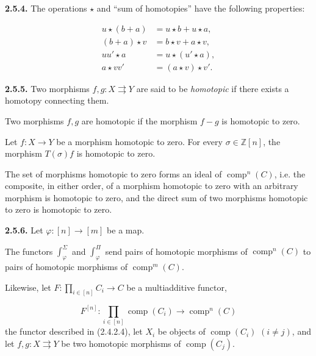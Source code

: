 %
\noindent\textbf{2.5.4.}\quad
The operations $\star$ and ``sum of homotopies'' have the following
properties:

\begin{equation}
  \begin{aligned}
    u\star(b+a) &= u\star b+u\star a,\\
    (b+a)\star v &= b\star v+a\star v,\\
    uu'\star a &= u\star(u'\star a),\\
    a\star vv' &= (a\star v)\star v'.
  \end{aligned}
  \tag{2.5.4.1}
\end{equation}

\noindent\textbf{2.5.5.}\quad
Two morphisms $f,g\colon X\rightrightarrows Y$ are said to be
\emph{homotopic} if there exists a homotopy connecting them.

Two morphisms $f,g$ are homotopic if the morphism $f-g$ is homotopic to zero.

Let $f\colon X\longrightarrow Y$ be a morphism homotopic to zero. For every
$\sigma\in\mathbb Z[n]$, the morphism $T(\sigma)f$ is homotopic to zero.

The set of morphisms homotopic to zero forms an ideal of
$\operatorname{comp}^{n}(C)$, i.e. the composite, in either order, of a
morphism homotopic to zero with an arbitrary morphism is homotopic to zero,
and the direct sum of two morphisms homotopic to zero is homotopic to zero.

\noindent\textbf{2.5.6.}\quad
Let $\varphi\colon[n]\longrightarrow[m]$ be a map.

The functors $\int_\varphi^\Sigma$ and $\int_\varphi^\Pi$ send pairs of
homotopic morphisms of $\operatorname{comp}^{n}(C)$ to pairs of homotopic
morphisms of $\operatorname{comp}^{m}(C)$.

Likewise, let
$F\colon\prod_{i\in[n]}C_i\longrightarrow C$ be a multiadditive functor,

\begin{equation*}
  F^{[n]}\colon
  \prod_{i\in[n]}\operatorname{comp}(C_i)
  \longrightarrow \operatorname{comp}^{n}(C)
\end{equation*}
the functor described in (2.4.2.4), let $X_i$ be objects of
$\operatorname{comp}(C_i)$ $(i\ne j)$, and let
$f,g\colon X\rightrightarrows Y$ be two homotopic morphisms of
$\operatorname{comp}(C_j)$.

